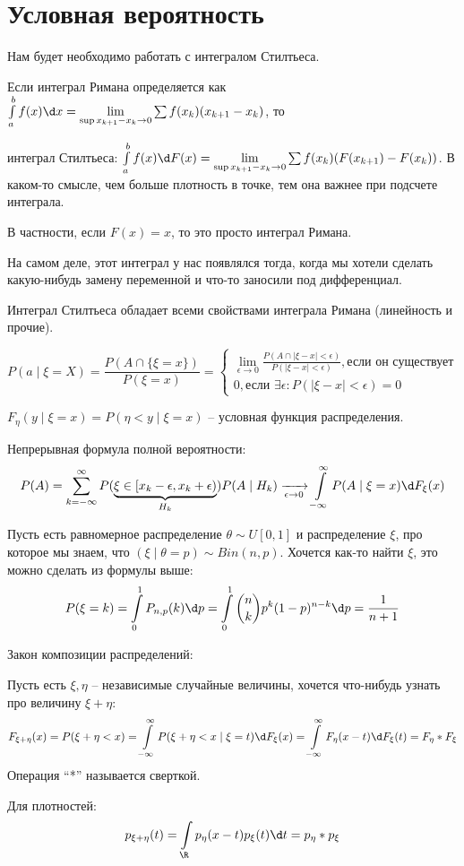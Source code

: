 \section{Условная вероятность}
Нам будет необходимо работать с интегралом Стилтьеса. 

Если интеграл Римана определяется как $\int\limits_a^b f(x)\d x = \lim\limits_{\sup x_{k+1}-x_k \to 0} \sum f(x_k)(x_{k+1} - x_k)$, то

интеграл Стилтьеса: $\int\limits_a^b f(x)\d F(x) = \lim \limits_{\sup x_{k+1}-x_k \to 0} \sum f(x_k) (F(x_{k+1}) - F(x_k))$. В каком-то смысле, чем больше плотность в точке, тем она важнее при подсчете интеграла.

В частности, если $F(x) = x$, то это просто интеграл Римана.
\begin{Rem}
На самом деле, этот интеграл у нас появлялся тогда, когда мы хотели сделать какую-нибудь замену переменной и что-то заносили под дифференциал.
\end{Rem}

Интеграл Стилтьеса обладает всеми свойствами интеграла Римана (линейность и прочие).

\begin{Def}
$$P(a \mid \xi = X) = \frac{P(A \cap \{\xi = x\})}{P(\xi = x)} = \begin{cases} \lim\limits_{\epsilon \to 0}  \frac{P(A \cap |\xi - x| < \epsilon)}{P(|\xi - x| < \epsilon)}, \text{если он существует} \\
0, \text{если } \exists \epsilon \colon P(|\xi - x| < \epsilon) = 0 \end{cases}$$
\end{Def}

\begin{Def}
    $F_{\eta}(y \mid \xi = x) = P(\eta < y \mid \xi = x)$ -- условная функция распределения.    
\end{Def}

Непрерывная формула полной вероятности:
$$P(A) = \sum\limits_{k=-\infty}^{\infty} P(\underbrace{\xi \in [x_k - \epsilon, x_k + \epsilon)}_{H_k}) P(A \mid H_k) \xrightarrow[\epsilon \to 0]{} \int\limits_{-\infty}^{\infty} P(A \mid \xi = x) \d F_{\xi}(x)$$

\begin{exmp}
Пусть есть равномерное распределение $\theta \sim U[0, 1]$ и распределение $\xi$, про которое мы знаем, что $(\xi \mid \theta = p) \sim Bin(n, p)$. 
Хочется как-то найти $\xi$, это можно сделать из формулы выше:
$$P(\xi = k) = \int\limits_0^1 P_{n, p}(k) \d p = \int\limits_0^1 {n \choose k} p^k (1 - p)^{n-k} \d p = \frac{1}{n + 1}$$
\end{exmp}

Закон композиции распределений:

Пусть есть $\xi, \eta$ -- независимые случайные величины, хочется что-нибудь узнать про величину $\xi + \eta$:
$$F_{\xi + \eta}(x) = P(\xi + \eta < x) = \int\limits_{-\infty}^{\infty} P(\xi + \eta < x \mid \xi = t) \d F_{\xi}(x) = \int\limits_{-\infty}^{\infty} F_{\eta}(x - t) \d F_{\xi}(t) = F_{\eta} * F_{\xi}$$
Операция ``*'' называется сверткой. 

Для плотностей:
$$p_{\xi + \eta}(t) = \int\limits_{\R} p_{\eta}(x - t) p_{\xi}(t) \d t = p_{\eta} * p_{\xi}$$